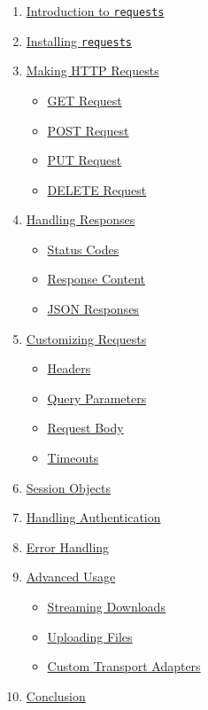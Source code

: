 \documentclass[
  letterpaper,
  DIV=11,
  numbers=noendperiod]{scrreprt}
\providecommand{\tightlist}{%
  \setlength{\itemsep}{0pt}\setlength{\parskip}{0pt}}\usepackage{longtable,booktabs,array}
\begin{document}
\begin{enumerate}
\def\labelenumi{\arabic{enumi}.}
\tightlist
\item
  \hyperref[introduction-to-requests]{Introduction to \texttt{requests}}
\item
  \hyperref[installing-requests]{Installing \texttt{requests}}
\item
  \hyperref[making-http-requests]{Making HTTP Requests}

  \begin{itemize}
  \tightlist
  \item
    \hyperref[get-request]{GET Request}
  \item
    \hyperref[post-request]{POST Request}
  \item
    \hyperref[put-request]{PUT Request}
  \item
    \hyperref[delete-request]{DELETE Request}
  \end{itemize}
\item
  \hyperref[handling-responses]{Handling Responses}

  \begin{itemize}
  \tightlist
  \item
    \hyperref[status-codes]{Status Codes}
  \item
    \hyperref[response-content]{Response Content}
  \item
    \hyperref[json-responses]{JSON Responses}
  \end{itemize}
\item
  \hyperref[customizing-requests]{Customizing Requests}

  \begin{itemize}
  \tightlist
  \item
    \hyperref[headers]{Headers}
  \item
    \hyperref[query-parameters]{Query Parameters}
  \item
    \hyperref[request-body]{Request Body}
  \item
    \hyperref[timeouts]{Timeouts}
  \end{itemize}
\item
  \hyperref[session-objects]{Session Objects}
\item
  \hyperref[handling-authentication]{Handling Authentication}
\item
  \hyperref[error-handling]{Error Handling}
\item
  \hyperref[advanced-usage]{Advanced Usage}

  \begin{itemize}
  \tightlist
  \item
    \hyperref[streaming-downloads]{Streaming Downloads}
  \item
    \hyperref[uploading-files]{Uploading Files}
  \item
    \hyperref[custom-transport-adapters]{Custom Transport Adapters}
  \end{itemize}
\item
  \hyperref[conclusion]{Conclusion}
\end{enumerate}
\end{document}

